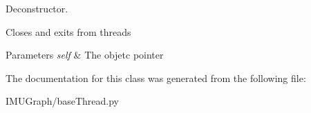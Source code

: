 Deconstructor. 

Closes and exits from threads 
\begin{DoxyParams}{Parameters}
{\em self} & The objetc pointer \\
\hline
\end{DoxyParams}


The documentation for this class was generated from the following file\-:\begin{DoxyCompactItemize}
\item 
I\-M\-U\-Graph/base\-Thread.\-py\end{DoxyCompactItemize}
